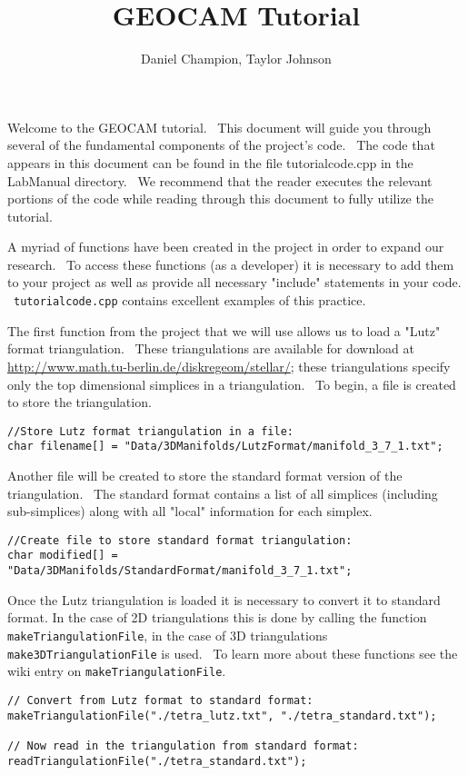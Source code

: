 \documentclass{amsart}
\theoremstyle{plain}
\numberwithin{equation}{section}
\begin{document}
\title{GEOCAM Tutorial}
\author{Daniel Champion, Taylor Johnson}
\maketitle

Welcome to the GEOCAM tutorial. \ This document will guide you through
several of the fundamental components of the project's code. \ The code that
appears in this document can be found in the file tutorialcode.cpp in the
LabManual directory. \ We recommend that the reader executes the relevant
portions of the code while reading through this document to fully utilize
the tutorial.

A myriad of functions have been created in the project in order to expand
our research. \ To access these functions (as a developer) it is necessary
to add them to your project as well as provide all necessary "include"
statements in your code. \ \texttt{tutorialcode.cpp} contains excellent
examples of this practice. 

The first function from the project that we will use allows us to load a
"Lutz" format triangulation. \ These triangulations are available for
download at \url{http://www.math.tu-berlin.de/diskregeom/stellar/}; these
triangulations specify only the top dimensional simplices in a
triangulation. \ To begin, a file is created to store the triangulation.%
\newline
\begin{verbatim}
//Store Lutz format triangulation in a file:
char filename[] = "Data/3DManifolds/LutzFormat/manifold_3_7_1.txt";
\end{verbatim}

\bigskip 

Another file will be created to store the standard format version of the
triangulation. \ The standard format contains a list of all simplices
(including sub-simplices) along with all "local" information for each
simplex.\newline
\begin{verbatim}
//Create file to store standard format triangulation:
char modified[] = "Data/3DManifolds/StandardFormat/manifold_3_7_1.txt";
\end{verbatim}

\bigskip 

Once the Lutz triangulation is loaded it is necessary to convert it to
standard format. In the case of 2D triangulations this is done by calling
the function \verb|makeTriangulationFile|, in the case of 3D triangulations 
\verb|make3DTriangulationFile| is used. \ To learn more about these
functions see the wiki entry on \verb|makeTriangulationFile|.\newline
\begin{verbatim}
// Convert from Lutz format to standard format:
makeTriangulationFile("./tetra_lutz.txt", "./tetra_standard.txt");
 
// Now read in the triangulation from standard format:
readTriangulationFile("./tetra_standard.txt");
\end{verbatim}
\end{document}
